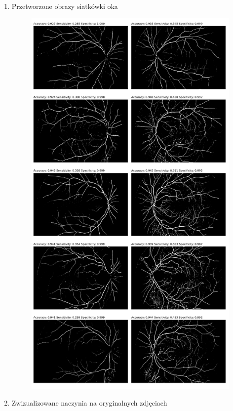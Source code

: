 \documentclass{article}
\begin{document}
\begin{enumerate}
\begin{enumerate}
\begin{enumerate}
                        \item Przetworzone obrazy siatkówki oka\\
                              \begin{figure}[h]
                                  \centering
                                  \begin{minipage}{0.73\textwidth}
                                      \centering
                                      \includegraphics[width=0.73\linewidth]{../res/preprocessed-images.png}
                                  \end{minipage}
                              \end{figure}
                              \newpage
                        \item Zwizualizowane naczynia na oryginalnych zdjęciach\\
                              \begin{figure}[h]

\end{figure}
\end{enumerate}
\end{enumerate}
\end{enumerate}
\end{document}
